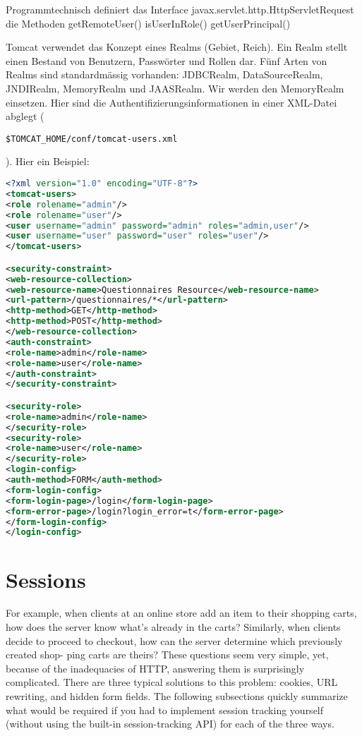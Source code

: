 \documentclass[a4paper,10pt]{scrreprt}
\begin{document}
{Programmtechnisch definiert das Interface javax.servlet.http.HttpServletRequest die Methoden
getRemoteUser()
isUserInRole()
getUserPrincipal()

Tomcat verwendet das Konzept eines Realms (Gebiet, Reich). Ein Realm stellt einen Bestand von
Benutzern, Passwörter und Rollen dar. Fünf Arten von Realms sind standardmässig vorhanden:
JDBCRealm, DataSourceRealm, JNDIRealm, MemoryRealm und JAASRealm.
Wir werden den MemoryRealm einsetzen. Hier sind die Authentifizierungsinformationen in einer
XML-Datei abglegt (\begin{verbatim}$TOMCAT_HOME/conf/tomcat-users.xml\end{verbatim}). Hier ein Beispiel:
\begin{lstlisting}[caption=users.xml servlet,language=xml]
<?xml version="1.0" encoding="UTF-8"?>
<tomcat-users>
<role rolename="admin"/>
<role rolename="user"/>
<user username="admin" password="admin" roles="admin,user"/>
<user username="user" password="user" roles="user"/>
</tomcat-users>

<security-constraint>
<web-resource-collection>
<web-resource-name>Questionnaires Resource</web-resource-name>
<url-pattern>/questionnaires/*</url-pattern>
<http-method>GET</http-method>
<http-method>POST</http-method>
</web-resource-collection>
<auth-constraint>
<role-name>admin</role-name>
<role-name>user</role-name>
</auth-constraint>
</security-constraint>

<security-role>
<role-name>admin</role-name>
</security-role>
<security-role>
<role-name>user</role-name>
</security-role>
<login-config>
<auth-method>FORM</auth-method>
<form-login-config>
<form-login-page>/login</form-login-page>
<form-error-page>/login?login_error=t</form-error-page>
</form-login-config>
</login-config>

\end{lstlisting}
\chapter{Sessions}
For example, when clients at an online store add an item to their shopping carts, how
does the server know what’s already in the carts? Similarly, when clients decide to proceed to checkout, how can the
server determine which previously created shop- ping carts are theirs? These questions seem very simple, yet,
because of the inadequacies of HTTP, answering them is surprisingly complicated.
There are three typical solutions to this problem: cookies, URL rewriting, and hidden form fields. The following
subsections quickly summarize what would be required if you had to implement session tracking yourself (without
using the built-in session-tracking API) for each of the three ways.

}
\end{document}
